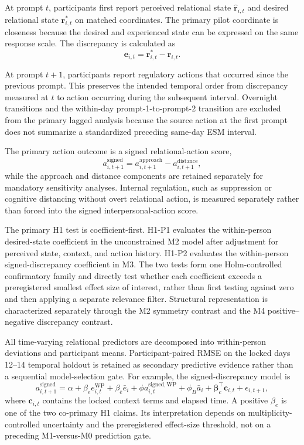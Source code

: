 At prompt \(t\), participants first report perceived relational state \(\hat{\mathbf r}_{i,t}\) and desired relational state \(\mathbf r^\ast_{i,t}\) on matched coordinates. The primary pilot coordinate is closeness because the desired and experienced state can be expressed on the same response scale. The discrepancy is calculated as
\[
\mathbf e_{i,t}=\mathbf r^\ast_{i,t}-\hat{\mathbf r}_{i,t}.
\]

At prompt \(t+1\), participants report regulatory actions that occurred since the previous prompt. This preserves the intended temporal order from discrepancy measured at \(t\) to action occurring during the subsequent interval. Overnight transitions and the within-day prompt-1-to-prompt-2 transition are excluded from the primary lagged analysis because the source action at the first prompt does not summarize a standardized preceding same-day ESM interval.

The primary action outcome is a signed relational-action score,
\[
a^{\mathrm{signed}}_{i,t+1}
=
a^{\mathrm{approach}}_{i,t+1}
-
a^{\mathrm{distance}}_{i,t+1},
\]
while the approach and distance components are retained separately for mandatory sensitivity analyses. Internal regulation, such as suppression or cognitive distancing without overt relational action, is measured separately rather than forced into the signed interpersonal-action score.

The primary H1 test is coefficient-first. H1-P1 evaluates the within-person desired-state coefficient in the unconstrained M2 model after adjustment for perceived state, context, and action history. H1-P2 evaluates the within-person signed-discrepancy coefficient in M3. The two tests form one Holm-controlled confirmatory family and directly test whether each coefficient exceeds a preregistered smallest effect size of interest, rather than first testing against zero and then applying a separate relevance filter. Structural representation is characterized separately through the M2 symmetry contrast and the M4 positive--negative discrepancy contrast.

All time-varying relational predictors are decomposed into within-person deviations and participant means. Participant-paired RMSE on the locked days 12--14 temporal holdout is retained as secondary predictive evidence rather than a sequential model-selection gate. For example, the signed-discrepancy model is
\begin{equation}
a^{\mathrm{signed}}_{i,t+1}
=
\alpha
+
\beta_e e^{\mathrm{WP}}_{i,t}
+
\beta_{\bar e}\bar e_i
+
\phi a^{\mathrm{signed,WP}}_{i,t}
+
\phi_B\bar a_i
+
\boldsymbol{\beta}_c^\top \mathbf c_{i,t}
+
\epsilon_{i,t+1},
\label{eq:h1-pilot}
\end{equation}
where \(\mathbf c_{i,t}\) contains the locked context terms and elapsed time. A positive \(\beta_e\) is one of the two co-primary H1 claims. Its interpretation depends on multiplicity-controlled uncertainty and the preregistered effect-size threshold, not on a preceding M1-versus-M0 prediction gate.

